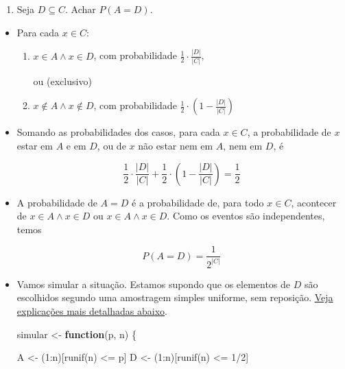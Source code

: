 \documentclass[
  11pt]{report}
\newenvironment{Shaded}{\begin{snugshade}}{\end{snugshade}}
\newcommand{\ControlFlowTok}[1]{\textcolor[rgb]{0.13,0.29,0.53}{\textbf{#1}}}
\newcommand{\DecValTok}[1]{\textcolor[rgb]{0.00,0.00,0.81}{#1}}
\newcommand{\FunctionTok}[1]{\textcolor[rgb]{0.00,0.00,0.00}{#1}}
\newcommand{\NormalTok}[1]{#1}
\newcommand{\OtherTok}[1]{\textcolor[rgb]{0.56,0.35,0.01}{#1}}
\newcommand{\SpecialCharTok}[1]{\textcolor[rgb]{0.00,0.00,0.00}{#1}}
\providecommand{\tightlist}{%
  \setlength{\itemsep}{0pt}\setlength{\parskip}{0pt}}
\renewenvironment{Shaded}{
    \begin{mdframed}[%
      roundcorner=2pt,%
      innerleftmargin=5pt,%
      innerrightmargin=5pt,%
      topline=true,%
      leftline=true,%
      rightline=true,%
      bottomline=true,%
      linewidth=0.5pt,%
      linecolor=black!20,%
      backgroundcolor=black!2,%
      skipabove=2ex,%
      skipbelow=2.5ex%
    ]%
  }
  {
    \end{mdframed}
  }
\begin{document}
\begin{rmdbox}

\begin{enumerate}
\def\labelenumi{\alph{enumi}.}
\tightlist
\item
  Seja $D \subseteq C$. Achar $P(A = D)$.
\end{enumerate}

\end{rmdbox}

\begin{itemize}
\item
  Para cada $x \in C$:

  \begin{enumerate}
  \def\labelenumi{\arabic{enumi}.}
  \item
    $x \in A \land x \in D$, com probabilidade $\frac12 \cdot \frac{|D|}{|C|}$,

    ou (exclusivo)
  \item
    $x \not\in A \land x \not\in D$, com probabilidade $\frac12 \cdot \left(1 - \frac{|D|}{|C|}\right)$
  \end{enumerate}
\item
  Somando as probabilidades dos casos, para cada $x \in C$, a probabilidade de $x$ estar em $A$ e em $D$, ou de $x$ não estar nem em $A$, nem em $D$, é

  \[
  \frac12 \cdot \frac{|D|}{|C|} + \frac12 \cdot \left(1 - \frac{|D|}{|C|}\right) = \frac12
  \]
\item
  A probabilidade de $A = D$ é a probabilidade de, para todo $x \in C$, acontecer de $x \in A \land x \in D$ ou $x \in A \land x \in D$. Como os eventos são independentes, temos

  \[
  P(A = D) = \frac1{2^{|C|}}
  \]
\item
  Vamos simular a situação. Estamos supondo que os elementos de $D$ são escolhidos segundo uma amostragem simples uniforme, sem reposição. \protect\hyperlink{amostra}{Veja explicações mais detalhadas abaixo}.

\hypertarget{simular-amigos}{%
\label{simular-amigos}}%
\begin{Shaded}
\begin{Highlighting}[]
\NormalTok{simular }\OtherTok{\textless{}{-}} \ControlFlowTok{function}\NormalTok{(p, n) \{}

\NormalTok{  A }\OtherTok{\textless{}{-}}\NormalTok{ (}\DecValTok{1}\SpecialCharTok{:}\NormalTok{n)[}\FunctionTok{runif}\NormalTok{(n) }\SpecialCharTok{\textless{}=}\NormalTok{ p]}
\NormalTok{  D }\OtherTok{\textless{}{-}}\NormalTok{ (}\DecValTok{1}\SpecialCharTok{:}\NormalTok{n)[}\FunctionTok{runif}\NormalTok{(n) }\SpecialCharTok{\textless{}=} \DecValTok{1}\SpecialCharTok{/}\DecValTok{2}\NormalTok{]}


\end{Highlighting}
\end{Shaded}
\end{itemize}
\end{document}
